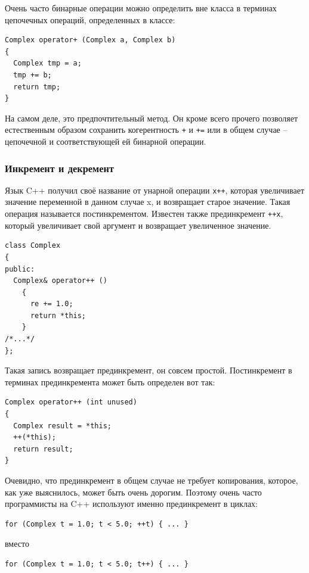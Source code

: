\documentclass[a4paper,12pt,oneside]{article}
\begin{document}
Очень часто бинарные операции можно определить вне класса в терминах цепочечных операций, определенных в классе:

\begin{lstlisting}
Complex operator+ (Complex a, Complex b)
{
  Complex tmp = a;
  tmp += b;
  return tmp;
}
\end{lstlisting}

На самом деле, это предпочтительный метод. Он кроме всего прочего позволяет естественным образом сохранить когерентность \lstinline!+! и \lstinline!+=! или в общем случае -- цепочечной и соответствующей ей бинарной операции.

\subsubsection{Инкремент и декремент}\label{IncrOverload}

Язык C++ получил своё название от унарной операции \lstinline!x++!, которая увеличивает значение переменной в данном случае x, и возвращает старое значение. Такая операция называется постинкрементом. Известен также прединкремент \lstinline!++x!, который увеличивает свой аргумент и возвращает увеличенное значение.

\begin{lstlisting}
class Complex
{
public:
  Complex& operator++ ()
    {
      re += 1.0;
      return *this;      
    }
/*...*/
};
\end{lstlisting}

Такая запись возвращает прединкремент, он совсем простой. Постинкремент в терминах прединкремента может быть определен вот так:

\begin{lstlisting}
Complex operator++ (int unused)
{
  Complex result = *this;
  ++(*this);
  return result;
} 
\end{lstlisting}

Очевидно, что прединкремент в общем случае не требует копирования, которое, как уже выяснилось, может быть очень дорогим. Поэтому очень часто программисты на C++ используют именно прединкремент в циклах:

\begin{lstlisting}
for (Complex t = 1.0; t < 5.0; ++t) { ... }
\end{lstlisting}

вместо

\begin{lstlisting}
for (Complex t = 1.0; t < 5.0; t++) { ... }
\end{lstlisting}
\end{document}
